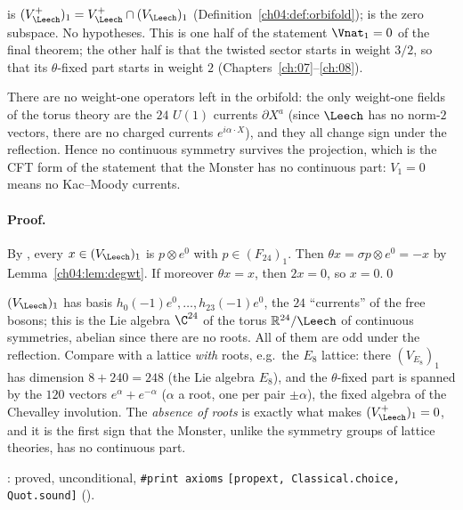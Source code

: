 \begin{dictionary}
 is $(V_\Leech^+)_1=V_\Leech^+\cap(V_\Leech)_1$ (Definition~\ref{ch04:def:orbifold});
 is the zero subspace. No hypotheses. This is one half of the statement $\Vnat_1=0$ of the
final theorem; the other half is that the twisted sector starts in weight $3/2$, so that its
$\theta$-fixed part starts in weight $2$ (Chapters~\ref{ch:07}--\ref{ch:08}).
\end{dictionary}

\begin{physics}
There are no weight-one operators left in the orbifold: the only weight-one fields of the torus theory are the $24$ $U(1)$ currents $\partial X^a$ (since $\Leech$ has no norm-$2$ vectors, there are no charged currents $e^{i\alpha\cdot X}$), and they all change sign under the reflection. Hence no continuous symmetry survives the projection, which is the CFT form of the statement that the Monster has no continuous part: $V_1=0$ means no Kac--Moody currents.
\end{physics}

\paragraph{Proof.} By , every $x\in(V_\Leech)_1$ is $p\otimes e^0$ with
$p\in(F_{24})_1$. Then $\theta x=\sigma p\otimes e^0=-x$ by Lemma~\ref{ch04:lem:degwt}. If moreover
$\theta x=x$, then $2x=0$, so $x=0$.\qed

\begin{example}
$(V_\Leech)_1$ has basis $h_0(-1)e^0,\dots,h_{23}(-1)e^0$, the $24$ ``currents'' of the free bosons;
this is the Lie algebra $\C^{24}$ of the torus $\mathbb{R}^{24}/\Leech$ of continuous symmetries, abelian
since there are no roots. All of them are odd under the reflection. Compare with a lattice
\emph{with} roots, e.g.\ the $E_8$ lattice: there $(V_{E_8})_1$ has dimension $8+240=248$ (the Lie
algebra $E_8$), and the $\theta$-fixed part is spanned by the $120$ vectors $e^\alpha+e^{-\alpha}$
($\alpha$ a root, one per pair $\pm\alpha$), the fixed algebra of the Chevalley involution. The
\emph{absence of roots} is exactly what makes $(V_\Leech^+)_1=0$, and it is the first sign that the
Monster, unlike the symmetry groups of lattice theories, has no continuous part.
\end{example}

\begin{status}
: proved, unconditional, \texttt{\#print axioms}
\texttt{[propext, Classical.choice, Quot.sound]} ().
\end{status}
